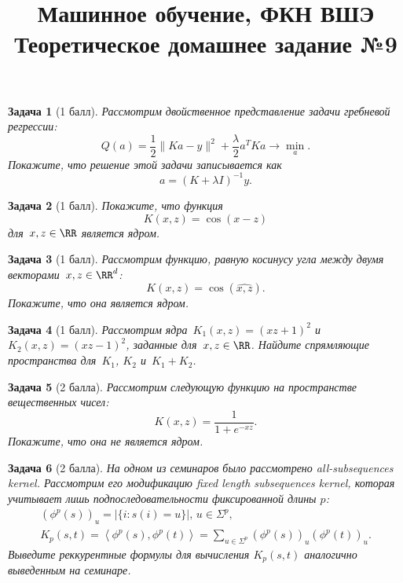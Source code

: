 \documentclass[12pt,fleqn]{article}
\title{Машинное обучение, ФКН ВШЭ\\Теоретическое домашнее задание №9}
\author{}
\date{}
\newtheorem{esProblem}{Задача}
\begin{document}
\maketitle

\begin{esProblem}[1 балл]
    Рассмотрим двойственное представление задачи гребневой регрессии:
    \[
        Q(a)
        =
        \frac{1}{2} \| K a - y \|^2 + \frac{\lambda}{2} a^T K a \to \min_a.
    \]
    Покажите, что решение этой задачи записывается как
    \[
        a = (K + \lambda I)^{-1} y.
    \]
\end{esProblem}

\begin{esProblem}[1 балл]
    Покажите, что функция
    \[
        K(x, z) = \cos(x - z)
    \]
    для~$x, z \in \RR$ является ядром.
\end{esProblem}

\begin{esProblem}[1 балл]
    Рассмотрим функцию, равную косинусу угла между двумя векторами~$x, z \in \RR^d$:
    \[
        K(x, z) = \cos(\widehat{x, z}).
    \]
    Покажите, что она является ядром.
\end{esProblem}

\begin{esProblem}[1 балл]
    Рассмотрим ядра~$K_1(x, z) = (xz + 1)^2$ и~$K_2(x, z) = (xz - 1)^2$,
    заданные для~$x, z \in \RR$.
    Найдите спрямляющие пространства для~$K_1$, $K_2$ и~$K_1 + K_2$.
\end{esProblem}

\begin{esProblem}[2 балла]
    Рассмотрим следующую функцию на пространстве вещественных чисел:
    \[
        K(x, z) = \frac{1}{1 + e^{-xz}}.
    \]
    Покажите, что она не является ядром.
\end{esProblem}

\begin{esProblem}[2 балла]
	На одном из семинаров было рассмотрено all-subsequences kernel. Рассмотрим его модификацию fixed length subsequences kernel, которая учитывает лишь подпоследовательности фиксированной длины $p$:
	\begin{align*}
		\left(\phi^p(s) \right)_u = \left| \{i: s(i) = u \} \right|, \, u \in \Sigma^p,\\
		K_p(s, t) = \left\langle \phi^p(s), \phi^p(t) \right\rangle = \sum_{u \in \Sigma^p} (\phi^p(s))_u (\phi^p(t))_u.
	\end{align*}
	Выведите реккурентные формулы для вычисления $K_p(s, t)$ аналогично выведенным на семинаре.
\end{esProblem}
\end{document}
